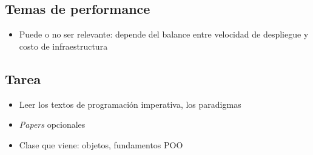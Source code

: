 \subsection{Temas de performance}
\begin{itemize}
    \item Puede o no ser relevante: 
    depende del balance entre velocidad de despliegue y costo de infraestructura
\end{itemize}

\subsection{Tarea}
\begin{itemize}
    \item Leer los textos de programación imperativa, los paradigmas
    \item \textit{Papers} opcionales
    \item Clase que viene: objetos, fundamentos POO 
\end{itemize}

